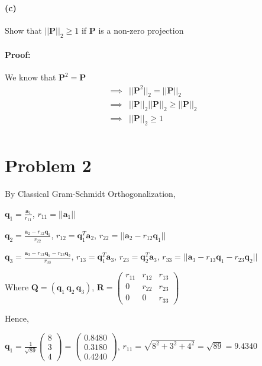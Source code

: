\documentclass[12pt, letterpaper]{article}
\begin{document}
\paragraph{(c)} Show that $||\mathbf{P}||_2 \geq 1$ if $\mathbf{P}$ is a non-zero projection
\paragraph{Proof:} We know that $\mathbf{P}^2 = \mathbf{P}$
\begin{align*}
  \implies &||\mathbf{P}^2||_2 = ||\mathbf{P}||_2\\
  \implies &||\mathbf{P}||_2||\mathbf{P}||_2 \geq ||\mathbf{P}||_2\\
  \implies &||\mathbf{P}||_2 \geq 1\\
\end{align*}

\pagebreak
\section*{Problem 2}
\label{sec:prob2}

By Classical Gram-Schmidt Orthogonalization,

$\mathbf{q}_1 = \frac{\mathbf{a}_1}{r_{11}}$,
$r_{11} = ||\mathbf{a}_1||$
 \bigskip

$\mathbf{q}_2 = \frac{\mathbf{a}_2 - r_{12}\mathbf{q}_1}{r_{22}}$,
$r_{12} = \mathbf{q}_1^T\mathbf{a}_2$,
$r_{22} = ||\mathbf{a}_2 - r_{12}\mathbf{q}_1||$
 \bigskip

$\mathbf{q}_3 = \frac{\mathbf{a}_3 - r_{13}\mathbf{q}_1 - r_{23}\mathbf{q}_2}{r_{33}}$,
$r_{13} = \mathbf{q}_1^T\mathbf{a}_3$,
$r_{23} = \mathbf{q}_2^T\mathbf{a}_3$,
$r_{33} = ||\mathbf{a}_3 - r_{13}\mathbf{q}_1 - r_{23}\mathbf{q}_2||$
 \bigskip

Where $\mathbf{Q} = (\mathbf{q}_1\,\mathbf{q}_2\,\mathbf{q}_3)$,
$\mathbf{R} = \begin{pmatrix} 
r_{11}  & r_{12} & r_{13} \\
0       & r_{22} & r_{23} \\
0       & 0 & r_{33}
 \end{pmatrix}$

 Hence,

 $\mathbf{q}_1 =
 \frac{1}{\sqrt{89}}\begin{pmatrix} 8 \\ 3 \\ 4 \end{pmatrix}
 = \begin{pmatrix} 0.8480 \\ 0.3180 \\ 0.4240 \end{pmatrix}$,
 $r_{11} = \sqrt{8^2 + 3^2 + 4^2} = \sqrt{89} = 9.4340$
 \bigskip
\end{document}

